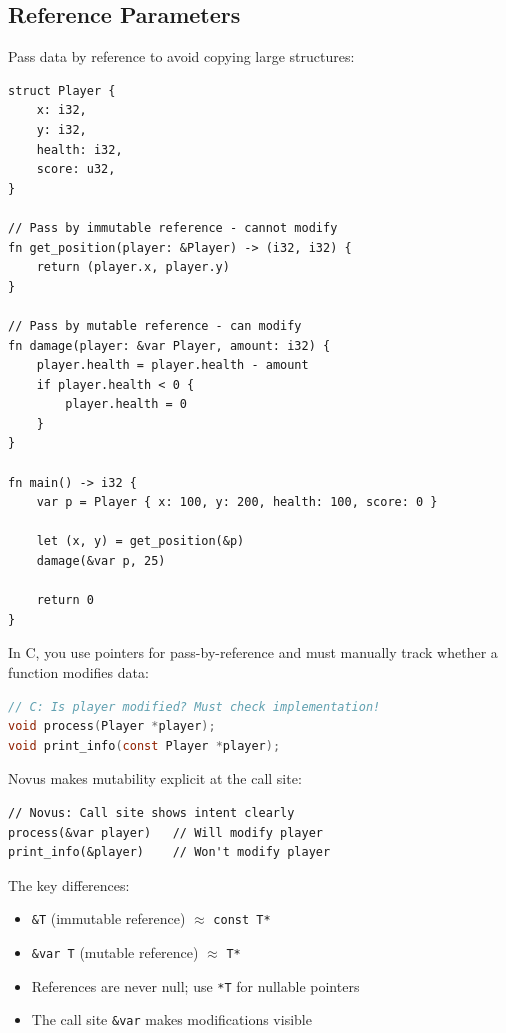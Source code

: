 \subsection{Reference Parameters}
\label{subsec:reference-params}

Pass data by reference to avoid copying large structures:

\begin{lstlisting}
struct Player {
    x: i32,
    y: i32,
    health: i32,
    score: u32,
}

// Pass by immutable reference - cannot modify
fn get_position(player: &Player) -> (i32, i32) {
    return (player.x, player.y)
}

// Pass by mutable reference - can modify
fn damage(player: &var Player, amount: i32) {
    player.health = player.health - amount
    if player.health < 0 {
        player.health = 0
    }
}

fn main() -> i32 {
    var p = Player { x: 100, y: 200, health: 100, score: 0 }

    let (x, y) = get_position(&p)
    damage(&var p, 25)

    return 0
}
\end{lstlisting}

\begin{comingfromc}
In C, you use pointers for pass-by-reference and must manually track whether a function modifies data:

\begin{lstlisting}[language=C]
// C: Is player modified? Must check implementation!
void process(Player *player);
void print_info(const Player *player);
\end{lstlisting}

Novus makes mutability explicit at the call site:

\begin{lstlisting}
// Novus: Call site shows intent clearly
process(&var player)   // Will modify player
print_info(&player)    // Won't modify player
\end{lstlisting}

The key differences:
\begin{itemize}
    \item \texttt{\&T} (immutable reference) $\approx$ \texttt{const T*}
    \item \texttt{\&var T} (mutable reference) $\approx$ \texttt{T*}
    \item References are never null; use \texttt{*T} for nullable pointers
    \item The call site \texttt{\&var} makes modifications visible
\end{itemize}
\end{comingfromc}

